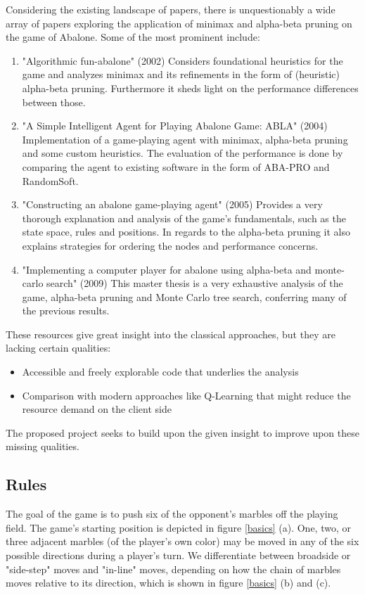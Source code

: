 \documentclass{../lib/llncs}
\begin{document}
Considering the existing landscape of papers, there is unquestionably a wide array of papers exploring the application of minimax and alpha-beta pruning on the game of Abalone. Some of the most prominent include:

\begin{enumerate}
	\item "Algorithmic fun-abalone" (2002) Considers foundational heuristics for the game and analyzes minimax and its refinements in the form of (heuristic) alpha-beta pruning. Furthermore it sheds light on the performance differences between those. \cite{aichholzer_algorithmic_2002}
	\item "A Simple Intelligent Agent for Playing Abalone Game: ABLA" (2004) Implementation of a game-playing agent with minimax, alpha-beta pruning and some custom heuristics. The evaluation of the performance is done by comparing the agent to existing software in the form of ABA-PRO and RandomSoft.\cite{ozcan_simple_2004}
	\item "Constructing an abalone game-playing agent" (2005) Provides a very thorough explanation and analysis of the game's fundamentals, such as the state space, rules and positions. In regards to the alpha-beta pruning it also explains strategies for ordering the nodes and performance concerns. \cite{lemmens_constructing_2005}
	\item "Implementing a computer player for abalone using alpha-beta and monte-carlo search" (2009) This master thesis is a very exhaustive analysis of the game, alpha-beta pruning and Monte Carlo tree search, conferring many of the previous results. \cite{chorus_implementing_2009}
\end{enumerate}

These resources give great insight into the classical approaches, but they are lacking certain qualities:
\begin{itemize}
	\item Accessible and freely explorable code that underlies the analysis
	\item Comparison with modern approaches like Q-Learning that might reduce the resource demand on the client side
\end{itemize}

The proposed project seeks to build upon the given insight to improve upon these missing qualities.

\subsection{Rules}
The goal of the game is to push six of the opponent's marbles off the playing field. The game's starting position is depicted in figure \ref{basics} (a). One, two, or three adjacent marbles (of the player's own color) may be moved in any of the six possible directions during a player's turn. We differentiate between broadside or "side-step" moves and "in-line" moves, depending on how the chain of marbles moves relative to its direction, which is shown in figure \ref{basics} (b) and (c).
\end{document}
